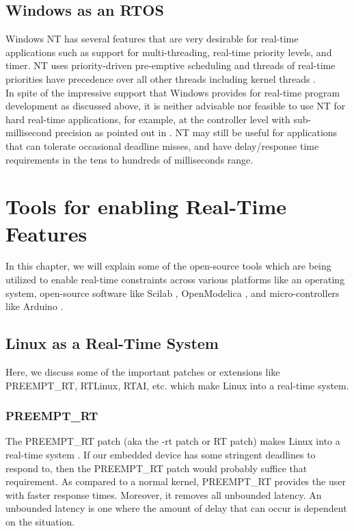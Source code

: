 \documentclass[12pt]{report}
\begin{document}
\section{Windows as an RTOS}
Windows NT has several features that are very desirable for real-time applications such as support for multi-threading, real-time priority levels, and timer. NT uses priority-driven pre-emptive scheduling and threads of real-time priorities have precedence over all other threads including kernel threads \cite{NPTEL}. \\

In spite of the impressive support that Windows provides for real-time program development as discussed above, it is neither advisable nor feasible to use NT for hard real-time applications, for example, at the controller level with sub-millisecond precision as pointed out in \cite{windowsnt-k}. NT may still be useful for applications that can tolerate occasional deadline misses, and have delay/response time requirements in the tens to hundreds of milliseconds range. 


\chapter{Tools for enabling Real-Time Features}
In this chapter, we will explain some of the open-source tools which are being utilized to enable real-time constraints across various platforms like an operating system, open-source software like Scilab \cite{scilab}, OpenModelica \cite{OM},  and micro-controllers like Arduino \cite{arduino}. \\

\section{Linux as a Real-Time System}
Here, we discuss some of the important patches or extensions like PREEMPT\_RT, RTLinux, RTAI, etc. which make Linux into a real-time system. 
\subsection{PREEMPT\_RT}
The PREEMPT\_RT patch (aka the -rt patch or RT patch) makes Linux into a real-time system \cite{rtlinux}. If our embedded device has some stringent deadlines to respond to, then the PREEMPT\_RT patch would probably suffice that requirement. As compared to a normal kernel, PREEMPT\_RT provides the user with faster response times. Moreover, it removes all unbounded latency. An unbounded latency is one where the amount of delay that can occur is dependent on the situation. \\
\end{document}
